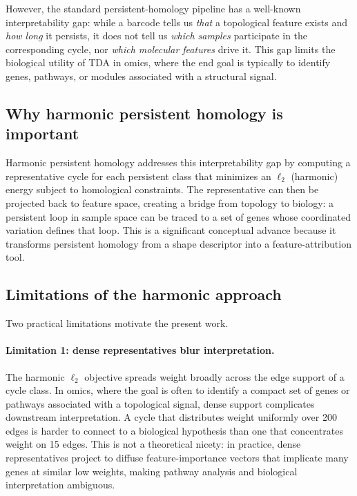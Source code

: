 \documentclass[11pt]{article}
\begin{document}
However, the standard persistent-homology pipeline has a well-known interpretability gap: while a barcode tells us \emph{that} a topological feature exists and \emph{how long} it persists, it does not tell us \emph{which samples} participate in the corresponding cycle, nor \emph{which molecular features} drive it.
This gap limits the biological utility of TDA in omics, where the end goal is typically to identify genes, pathways, or modules associated with a structural signal.

\subsection{Why harmonic persistent homology is important}

Harmonic persistent homology \cite{harmonicPH} addresses this interpretability gap by computing a representative cycle for each persistent class that minimizes an $\ell_2$ (harmonic) energy subject to homological constraints.
The representative can then be projected back to feature space, creating a bridge from topology to biology: a persistent loop in sample space can be traced to a set of genes whose coordinated variation defines that loop.
This is a significant conceptual advance because it transforms persistent homology from a shape descriptor into a feature-attribution tool.

\subsection{Limitations of the harmonic approach}

Two practical limitations motivate the present work.

\paragraph{Limitation 1: dense representatives blur interpretation.}
The harmonic $\ell_2$ objective spreads weight broadly across the edge support of a cycle class.
In omics, where the goal is often to identify a compact set of genes or pathways associated with a topological signal, dense support complicates downstream interpretation.
A cycle that distributes weight uniformly over 200 edges is harder to connect to a biological hypothesis than one that concentrates weight on 15 edges.
This is not a theoretical nicety: in practice, dense representatives project to diffuse feature-importance vectors that implicate many genes at similar low weights, making pathway analysis and biological interpretation ambiguous.
\end{document}
